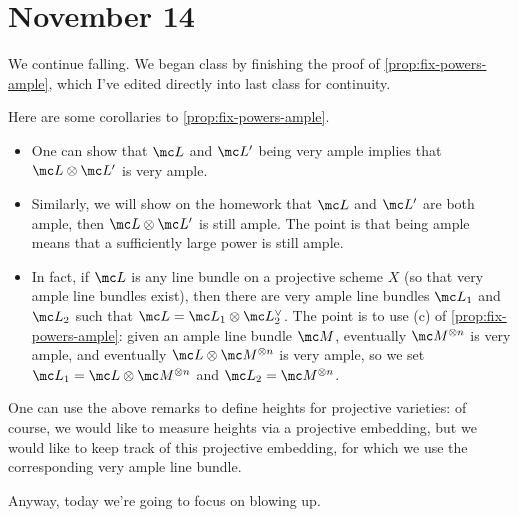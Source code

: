 \documentclass[../notes.tex]{subfiles}
\begin{document}
\section{November 14}

We continue falling. We began class by finishing the proof of \autoref{prop:fix-powers-ample}, which I've edited directly into last class for continuity.
\begin{remark}
	Here are some corollaries to \autoref{prop:fix-powers-ample}.
	\begin{itemize}
		\item One can show that $\mc L$ and $\mc L'$ being very ample implies that $\mc L\otimes\mc L'$ is very ample.
		\item Similarly, we will show on the homework that $\mc L$ and $\mc L'$ are both ample, then $\mc L\otimes\mc L'$ is still ample. The point is that being ample means that a sufficiently large power is still ample.
		\item In fact, if $\mc L$ is any line bundle on a projective scheme $X$ (so that very ample line bundles exist), then there are very ample line bundles $\mc L_1$ and $\mc L_2$ such that $\mc L=\mc L_1\otimes\mc L_2^\lor$. The point is to use (c) of \autoref{prop:fix-powers-ample}: given an ample line bundle $\mc M$, eventually $\mc M^{\otimes n}$ is very ample, and eventually $\mc L\otimes\mc M^{\otimes n}$ is very ample, so we set $\mc L_1=\mc L\otimes\mc M^{\otimes n}$ and $\mc L_2=\mc M^{\otimes n}$.
	\end{itemize}
\end{remark}
\begin{remark}
	One can use the above remarks to define heights for projective varieties: of course, we would like to measure heights via a projective embedding, but we would like to keep track of this projective embedding, for which we use the corresponding very ample line bundle.
\end{remark}
Anyway, today we're going to focus on blowing up.
\end{document}
